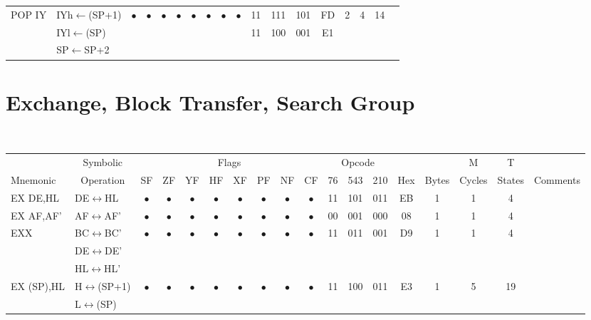 \documentclass[oneside,a4paper]{book}
\begin{document}
{\begin{tabular}{llcccccccccccccccl}
		POP IY & IYh$\leftarrow$(SP+1) &
			$\bullet$ & $\bullet$ & $\bullet$ & $\bullet$ & $\bullet$ & $\bullet$ & $\bullet$ & $\bullet$ &
			11 & 111 & 101 & 
			FD & 2 & 
			4 & 14 & \\ 
		& IYl$\leftarrow$(SP) & \multicolumn{8}{c}{} & 11 & 100 & 001 & E1 & & & \\
		& SP$\leftarrow$SP+2 & \\[4pt]

		\hline

	\end{tabular}
}


\section{Exchange, Block Transfer, Search Group}

{\tt \scriptsize \setlength{\fboxsep}{0.25mm}
\setlength{\tabcolsep}{1mm}
\begin{tabular}{llc@{ }c@{ }c@{ }c@{ }c@{ }c@{ }c@{ }cc@{ }c@{ }cccccll}\hline
 & \multicolumn{1}{c}{Symbolic} & \multicolumn{8}{c}{Flags} & \multicolumn{3}{c}{Opcode} & & & M & T & \\
Mnemonic & \multicolumn{1}{c}{Operation} & SF & ZF & YF & HF & XF & PF & NF & CF & 76 & 543 & 210 
	& Hex & Bytes & Cycles & States & \multicolumn{2}{l}{Comments} \\ \hline

EX DE,HL & DE$\leftrightarrow$HL & 
	$\bullet$ & $\bullet$ & $\bullet$ & $\bullet$ & $\bullet$ & $\bullet$ & $\bullet$ & $\bullet$ & 11 & 101 & 011
	& EB & 1 & 1 & 4 & & \\ 

EX AF,AF' & AF$\leftrightarrow$AF' & 
	$\bullet$ & $\bullet$ & $\bullet$ & $\bullet$ & $\bullet$ & $\bullet$ & $\bullet$ & $\bullet$ & 00 & 001 & 000
	& 08 & 1 & 1 & 4 & & \\ 

EXX & BC$\leftrightarrow$BC' & 
	$\bullet$ & $\bullet$ & $\bullet$ & $\bullet$ & $\bullet$ & $\bullet$ & $\bullet$ & $\bullet$ & 11 & 011 & 001
	& D9 & 1 & 1 & 4 & & \\ 
	& DE$\leftrightarrow$DE' & \multicolumn{15}{c}{} & & \\ 
	& HL$\leftrightarrow$HL' & \multicolumn{15}{c}{} & & \\ 

EX (SP),HL & H$\leftrightarrow$(SP+1) & 
	$\bullet$ & $\bullet$ & $\bullet$ & $\bullet$ & $\bullet$ & $\bullet$ & $\bullet$ & $\bullet$ & 11 & 100 & 011
	& E3 & 1 & 5 & 19 & & \\ 
	& L$\leftrightarrow$(SP) & \multicolumn{15}{c}{} & & \\ 


\end{tabular}}
\end{document}
